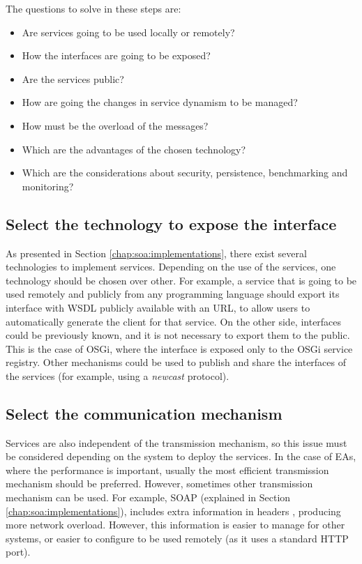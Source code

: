 The questions to solve in these steps are:
\begin{itemize}
\item Are services going to be used locally or remotely?
\item How the interfaces are going to be exposed?
\item Are the services public?
\item How are going the changes in service dynamism to be managed?
\item How must be the overload of the messages? 
\item Which are the advantages of the chosen technology?
\item Which are the considerations about security, persistence, benchmarking and monitoring?
\end{itemize} 

\subsection{Select the technology to expose the interface}
As presented in Section \ref{chap:soa:implementations}, there exist several technologies to implement services. Depending on the use of the services, one technology should be chosen over other. For example, a service that is going to be used remotely and publicly from any programming language should export its interface with WSDL publicly available with an URL, to allow users to automatically generate the client for that service. On the other side, interfaces could be previously known, and it is not necessary to export them to the public. This is the case of OSGi, where the interface is exposed only to the OSGi service registry. Other mechanisms could be used to publish and share the interfaces of the services (for example, using a {\em newcast} protocol).

\subsection{Select the communication mechanism}
Services are also independent of the transmission mechanism, so this issue must be considered depending on the system to deploy the services. In the case of EAs, where the performance is important, usually the most efficient transmission mechanism should be preferred. However, sometimes other transmission mechanism can be used. For example, SOAP (explained in Section \ref{chap:soa:implementations}), includes extra information in headers \cite{Castillo13SOAP}, producing more network overload. However, this information is easier to manage for other systems, or easier to configure to be used remotely (as it uses a standard HTTP port).

